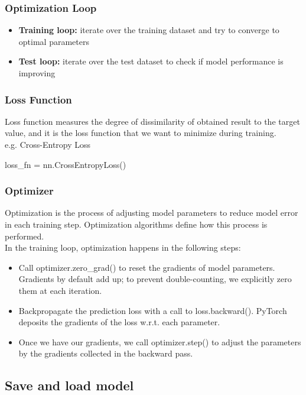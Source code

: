 \documentclass[12pt,hyperref,a4paper,UTF8]{article}
\begin{document}
\subsubsection{Optimization Loop}
\begin{itemize}
    \item \textbf{Training loop:} iterate over the training dataset and try to converge to optimal parameters
    \item \textbf{Test loop:} iterate over the test dataset to check if model performance is improving
\end{itemize}

\subsubsection{Loss Function}
\textbf{}  Loss function measures the degree of dissimilarity of obtained result to the target value, and it is the loss function that we want to minimize during training. \\
e.g. Cross-Entropy Loss
\begin{python}
    loss_fn = nn.CrossEntropyLoss()
\end{python}

\subsubsection{Optimizer}
\textbf{} Optimization is the process of adjusting model parameters to reduce model error in each training step. Optimization algorithms define how this process is performed.\\

In the training loop, optimization happens in the following steps:
\begin{itemize}
    \item Call optimizer.zero\_grad() to reset the gradients of model parameters. Gradients by default add up; to prevent double-counting, we explicitly zero them at each iteration.
    \item Backpropagate the prediction loss with a call to loss.backward(). PyTorch deposits the gradients of the loss w.r.t. each parameter.
    \item Once we have our gradients, we call optimizer.step() to adjust the parameters by the gradients collected in the backward pass.
\end{itemize}

\subsection{Save and load model}
\end{document}
